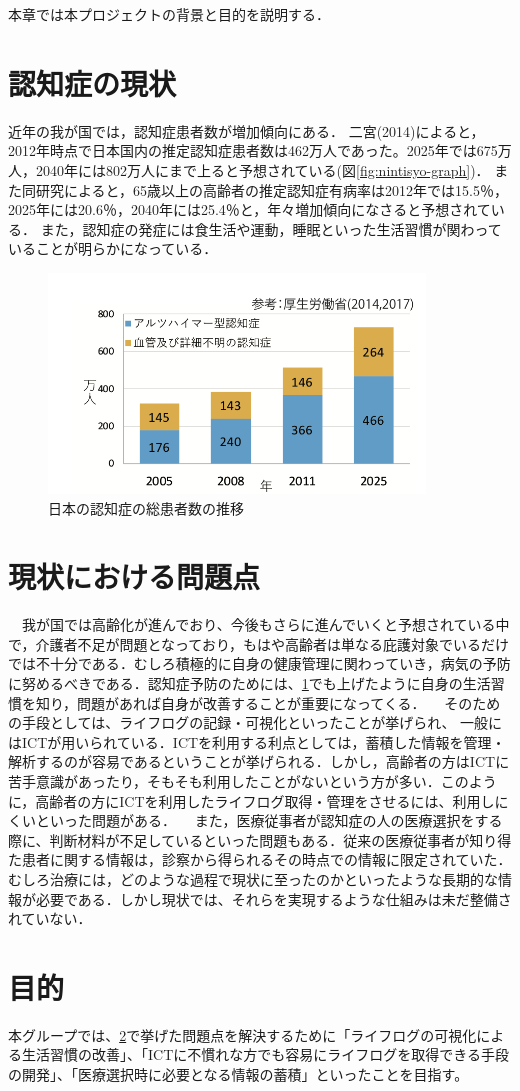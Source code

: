 \documentclass[../report]{subfiles}
\begin{document}
本章では本プロジェクトの背景と目的を説明する．

\section{認知症の現状} \label{sec:genzyou}
近年の我が国では，認知症患者数が増加傾向にある．
二宮(2014)によると，2012年時点で日本国内の推定認知症患者数は462万人であった\cite{syourai}。2025年では675万人，2040年には802万人にまで上ると予想されている(図\ref{fig:nintisyo-graph})．
また同研究によると，65歳以上の高齢者の推定認知症有病率は2012年では15.5％，2025年には20.6％，2040年には25.4％と，年々増加傾向になさると予想されている\cite{syourai}．
また，認知症の発症には食生活や運動，睡眠といった生活習慣が関わっていることが明らかになっている\cite{seikatsu}．
\begin{figure}[htbp]
    \begin{center}
        \includegraphics[width=10cm]{imgs/ninchisyo-graph.png}
        \caption{日本の認知症の総患者数の推移}
        \label{fig:ninchisyo-graph}
    \end{center}
\end{figure}

\section{現状における問題点} \label{sec:mondai}
　我が国では高齢化が進んでおり、今後もさらに進んでいくと予想されている中で，介護者不足が問題となっており，もはや高齢者は単なる庇護対象でいるだけでは不十分である\cite{kaigo}．むしろ積極的に自身の健康管理に関わっていき，病気の予防に努めるべきである．認知症予防のためには、\ref{sec:genzyou}でも上げたように自身の生活習慣を知り，問題があれば自身が改善することが重要になってくる．
　そのための手段としては、ライフログの記録・可視化といったことが挙げられ\cite{lifelog}、 一般にはICTが用いられている．ICTを利用する利点としては，蓄積した情報を管理・解析するのが容易であるということが挙げられる．しかし，高齢者の方はICTに苦手意識があったり，そもそも利用したことがないという方が多い．このように，高齢者の方にICTを利用したライフログ取得・管理をさせるには、利用しにくいといった問題がある．
　また，医療従事者が認知症の人の医療選択をする際に、判断材料が不足しているといった問題もある．従来の医療従事者が知り得た患者に関する情報は，診察から得られるその時点での情報に限定されていた．むしろ治療には，どのような過程で現状に至ったのかといったような長期的な情報が必要である．しかし現状では、それらを実現するような仕組みは未だ整備されていない．

\section{目的}
本グループでは、\ref{sec:mondai}で挙げた問題点を解決するために「ライフログの可視化による生活習慣の改善」、「ICTに不慣れな方でも容易にライフログを取得できる手段の開発」、「医療選択時に必要となる情報の蓄積」といったことを目指す。
\end{document}
